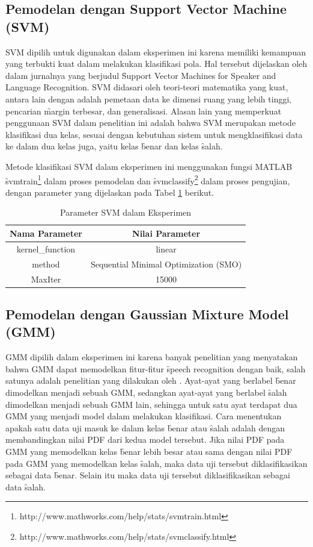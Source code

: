 	\subsection{Pemodelan dengan Support Vector Machine (SVM)}
	SVM dipilih untuk digunakan dalam eksperimen ini karena memiliki kemampuan yang terbukti kuat dalam melakukan klasifikasi pola. Hal tersebut dijelaskan oleh \cite{campbell2006support} dalam jurnalnya yang berjudul \f{Support Vector Machines for Speaker and Language Recognition}. SVM didasari oleh teori-teori matematika yang kuat, antara lain dengan adalah pemetaan data ke dimensi ruang yang lebih tinggi, pencarian \f{margin} terbesar, dan generalisasi. Alasan lain yang memperkuat penggunaan SVM dalam penelitian ini adalah bahwa SVM merupakan metode klasifikasi dua kelas, sesuai dengan kebutuhan sistem untuk mengklasifikasi data ke dalam dua kelas juga, yaitu kelas \f{benar} dan kelas \f{salah}.

  Metode klasifikasi SVM dalam eksperimen ini menggunakan fungsi MATLAB \f{svmtrain}\footnote{http://www.mathworks.com/help/stats/svmtrain.html} dalam proses pemodelan dan \f{svmclassify}\footnote{http://www.mathworks.com/help/stats/svmclassify.html} dalam proses pengujian, dengan parameter yang dijelaskan pada Tabel \ref{table:parametersvm} berikut.

  \begin{table}
    \centering
    \caption{Parameter SVM dalam Eksperimen}
    \begin{tabular}{|c|c|}
      \hline
      \textbf{Nama Parameter} & \textbf{Nilai Parameter} \\ \hline
      kernel\_function & linear \\ \hline
      method & Sequential Minimal Optimization (SMO) \\ \hline
      MaxIter & 15000 \\ \hline
    \end{tabular}
    \label{table:parametersvm}
  \end{table}



  \subsection{Pemodelan dengan Gaussian Mixture Model (GMM)}
  GMM dipilih dalam eksperimen ini karena banyak penelitian yang menyatakan bahwa GMM dapat memodelkan fitur-fitur \f{speech recognition} dengan baik, salah satunya adalah penelitian yang dilakukan oleh \cite{zahra2013unique}. Ayat-ayat yang berlabel \f{benar} dimodelkan menjadi sebuah GMM, sedangkan ayat-ayat yang berlabel \f{salah} dimodelkan menjadi sebuah GMM lain, sehingga untuk satu ayat terdapat dua GMM yang menjadi model dalam melakukan klasifikasi. Cara menentukan apakah satu data uji masuk ke dalam kelas \f{benar} atau \f{salah} adalah dengan membandingkan nilai PDF dari kedua model tersebut. Jika nilai PDF pada GMM yang memodelkan kelas \f{benar} lebih besar atau sama dengan nilai PDF pada GMM yang memodelkan kelas \f{salah}, maka data uji tersebut diklasifikasikan sebagai data \f{benar}. Selain itu maka data uji tersebut diklasifikasikan sebagai data \f{salah}.

